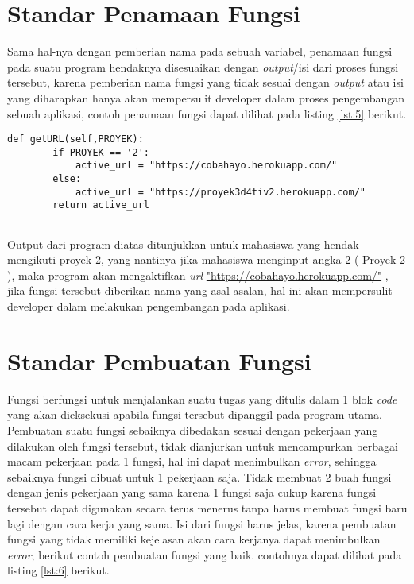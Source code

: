 \section{Standar Penamaan Fungsi}
\par 
Sama hal-nya dengan pemberian nama pada sebuah variabel, penamaan fungsi pada suatu program hendaknya disesuaikan dengan \textit{output}/isi dari proses fungsi tersebut, karena pemberian nama fungsi yang tidak sesuai dengan \textit{output} atau isi yang diharapkan hanya akan mempersulit developer dalam proses pengembangan sebuah aplikasi, contoh penamaan fungsi dapat dilihat pada listing \ref{lst:5} berikut.

\begin{lstlisting}[caption=Contoh commit standar,label={lst:5}]
	def getURL(self,PROYEK):
		if PROYEK == '2':
			active_url = "https://cobahayo.herokuapp.com/"
		else:
			active_url = "https://proyek3d4tiv2.herokuapp.com/"
		return active_url
		
\end{lstlisting}

\par 
Output dari program diatas ditunjukkan untuk mahasiswa yang hendak mengikuti proyek 2, yang nantinya jika mahasiswa menginput angka 2 ( Proyek 2 ), maka program akan mengaktifkan \textit{url} \url{"https://cobahayo.herokuapp.com/"} , jika fungsi tersebut diberikan nama yang asal-asalan, hal ini akan mempersulit developer dalam melakukan pengembangan pada aplikasi.

\section{Standar Pembuatan Fungsi}
\par 
Fungsi berfungsi untuk menjalankan suatu tugas yang ditulis dalam 1 blok \textit{code} yang akan dieksekusi apabila fungsi tersebut dipanggil pada program utama. Pembuatan suatu fungsi sebaiknya dibedakan sesuai dengan pekerjaan yang dilakukan oleh fungsi tersebut, tidak dianjurkan untuk mencampurkan berbagai macam pekerjaan pada 1 fungsi, hal ini dapat menimbulkan \textit{error}, sehingga sebaiknya fungsi dibuat untuk 1 pekerjaan saja. Tidak membuat 2 buah fungsi dengan jenis pekerjaan yang sama karena 1 fungsi saja cukup karena fungsi tersebut dapat digunakan secara terus menerus tanpa harus membuat fungsi baru lagi dengan cara kerja yang sama. Isi dari fungsi harus jelas, karena pembuatan fungsi yang tidak memiliki kejelasan akan cara kerjanya dapat menimbulkan \textit{error}, berikut contoh pembuatan fungsi yang baik. contohnya dapat dilihat pada listing \ref{lst:6} berikut.

